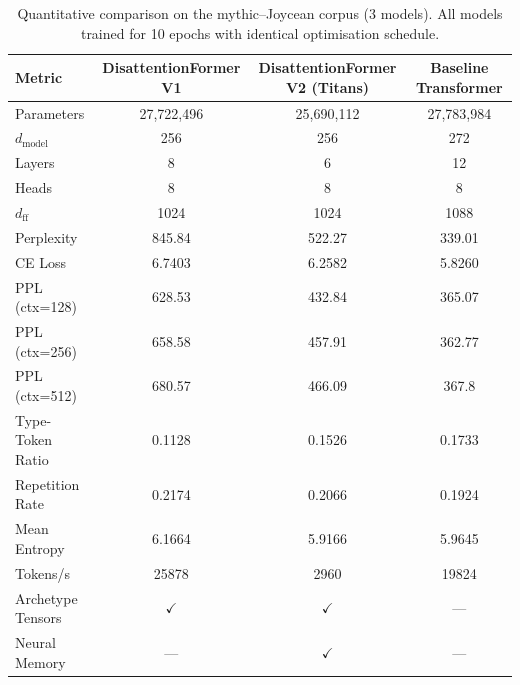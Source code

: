 \begin{table}[h]
\centering
\caption{Quantitative comparison on the mythic--Joycean corpus (3 models).
All models trained for 10 epochs with identical optimisation schedule.}
\label{tab:benchmark}
\begin{tabular}{lccc}
\toprule
\textbf{Metric} & \textbf{DisattentionFormer V1} & \textbf{DisattentionFormer V2 (Titans)} & \textbf{Baseline Transformer} \\
\midrule
Parameters & 27,722,496 & 25,690,112 & 27,783,984 \\
$d_{{\text{{model}}}}$ & 256 & 256 & 272 \\
Layers & 8 & 6 & 12 \\
Heads & 8 & 8 & 8 \\
$d_{{\text{{ff}}}}$ & 1024 & 1024 & 1088 \\
\midrule
Perplexity & 845.84 & 522.27 & 339.01 \\
CE Loss & 6.7403 & 6.2582 & 5.8260 \\
\midrule
PPL (ctx=128) & 628.53 & 432.84 & 365.07 \\
PPL (ctx=256) & 658.58 & 457.91 & 362.77 \\
PPL (ctx=512) & 680.57 & 466.09 & 367.8 \\
\midrule
Type-Token Ratio & 0.1128 & 0.1526 & 0.1733 \\
Repetition Rate & 0.2174 & 0.2066 & 0.1924 \\
Mean Entropy & 6.1664 & 5.9166 & 5.9645 \\
\midrule
Tokens/s & 25878 & 2960 & 19824 \\
\midrule
Archetype Tensors & $\checkmark$ & $\checkmark$ & --- \\
Neural Memory & --- & $\checkmark$ & --- \\
\bottomrule
\end{tabular}
\end{table}
